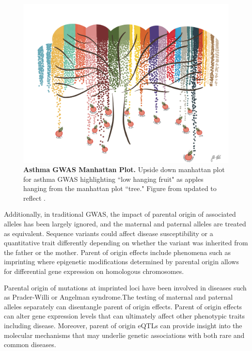\begin{figure}
\centering
\includegraphics[width=5in]{img/ch01/fig-01-lowhangingfruit.pdf}
\caption[Asthma GWAS Manhattan Plot.]{\textbf{Asthma GWAS Manhattan Plot.} Upside down manhattan plot for asthma GWAS highlighting ``low hanging fruit" as apples hanging from the manhattan plot ``tree." Figure from \cite{Ober:2016ga} updated to reflect \cite{Demenais:2018hy}.}
\label{fig:fig-01-lowhangingfruit}
\end{figure}

Additionally, in traditional GWAS, the impact of parental origin of associated alleles has been largely ignored, and the maternal and paternal alleles are treated as equivalent. Sequence variants could affect disease susceptibility or a quantitative trait differently depending on whether the variant was inherited from the father or the mother. Parent of origin effects include phenomena such as imprinting where epigenetic modifications determined by parental origin allows for differential gene expression on homologous chromosomes\cite{Lokody2014,Lawson2013}. 

Parental origin of mutations at imprinted loci have been involved in diseases such as Prader-Willi or Angelman syndrome\cite{Lawson2013,Peters2014}.The testing of maternal and paternal alleles separately can disentangle parent of origin effects. Parent of origin effects can alter gene expression levels that can ultimately affect other phenotypic traits including disease. Moreover, parent of origin eQTLs can provide insight into the molecular mechanisms that may underlie genetic associations with both rare and common diseases\cite{Lawson2013,Peters2014,Kong:2009kk,Stridh2014,Falls1999}.

